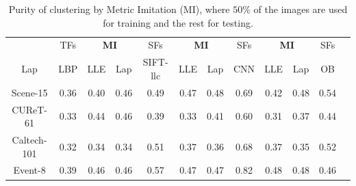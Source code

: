 




\begin{table}[!tb]
  \centering \small \setlength{\tabcolsep}{.60em} 
  \caption{Purity of clustering by Metric Imitation (MI), where $50\%$ of the images are used for training and the rest for testing.}
  \begin{tabular}{c|c|ccc|ccc|cccc}
   & TFs & \multicolumn{2}{c}{\textbf{MI}} & SFs & \multicolumn{2}{c}{ \textbf{MI} } & SFs & \multicolumn{2}{c}{ \textbf{MI}} & SFs  \\   
  Lap  & LBP & LLE & Lap & SIFT-llc  & LLE & Lap & CNN &  LLE & Lap & OB     \\   \hline
    Scene-15 & 0.36  & 0.40  & 0.46  & 0.49    & 0.47  & 0.48  & 0.69    & 0.42  & 0.48  & 0.54 \\ 
    CUReT-61 & 0.33  & 0.44  & 0.46  & 0.39    & 0.33  & 0.41  & 0.60  & 0.31  & 0.37  & 0.44 \\ 
    Caltech-101 & 0.32  & 0.34  & 0.34  & 0.51   & 0.37  & 0.36  & 0.68       & 0.37  & 0.35 & 0.52    \\
    Event-8 & 0.39  & 0.46  & 0.46  & 0.57    & 0.47  & 0.47  & 0.82    & 0.48  & 0.48  & 0.46 \\  
  \end{tabular}
  \label{tab:clustering}
\end{table}



